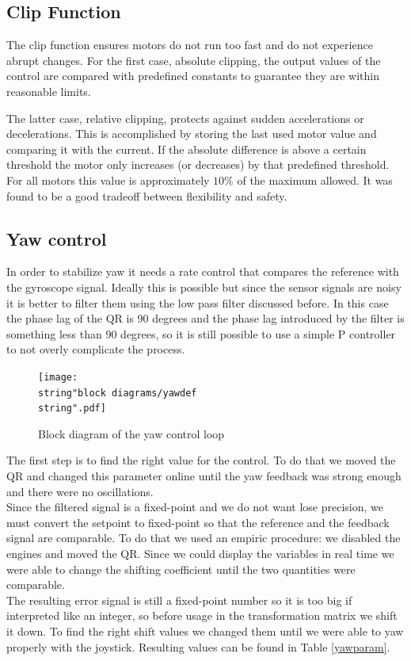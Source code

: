 \documentclass[11pt]{article}
\begin{document}
\subsection{Clip Function}

The clip function ensures motors do not run too fast and do not experience abrupt changes. For the first case, absolute clipping, the output values of the control are compared with predefined constants to guarantee they are within reasonable limits.

The latter case, relative clipping, protects against sudden accelerations or decelerations. This is accomplished by storing the last used motor value and comparing it with the current.
If the absolute difference is above a certain threshold the motor only increases (or decreases) by that predefined threshold. For all motors this value is approximately $10\%$ of the maximum allowed. It was found to be a good tradeoff between flexibility and safety.  


\subsection{Yaw control}

In order to stabilize yaw it needs a rate control that compares the
reference with the gyroscope signal. Ideally this is possible but
since the sensor signals are noisy it is better to filter them using the
low pass filter discussed before. In this case the phase lag of the
QR is 90 degrees and the phase lag introduced by the filter is something
less than 90 degrees, so it is still possible to use a simple P controller
to not overly complicate the process.

%
\begin{figure}[h]
\centering
\texttt{[image: \\string"block diagrams/yawdef\\string".pdf]}
\caption{Block diagram of the yaw control loop}
\label{yawblock}

\end{figure}


The first step is to find the right value for the control. To do
that we moved the QR and changed this parameter online until the
yaw feedback was strong enough and there were no oscillations.\\
Since the filtered signal is a fixed-point and we do not want lose
precision, we must convert the setpoint to fixed-point so that
the reference and the feedback signal are comparable. To do that
we used an empiric procedure: we disabled the engines and moved
the QR. Since we could display the variables in real time we were
able to change the shifting coefficient until the two quantities were
comparable.\\
The resulting error signal is still a fixed-point number so it
is too big if interpreted like an integer, so before usage
in the transformation matrix we shift it down. To find the
right shift values we changed them until we were able to yaw properly
with the joystick. Resulting values can be found in Table \ref{yawparam}.
\end{document}
